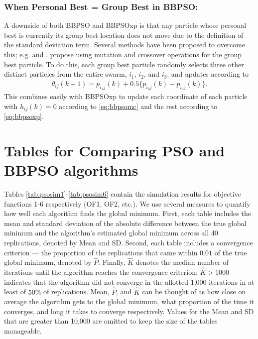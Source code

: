\documentclass[cmbright]{staauth}
\numberwithin{table}{section}
\begin{document}
\subsubsection{When Personal Best = Group Best in BBPSO:}
A downside of both BBPSO and BBPSOxp is that any particle whose personal best is currently its group best location does not move due to the definition of the standard deviation term. Several methods have been proposed to overcome this; e.g. \cite{hsieh2010modified} and \cite{zhang2011novel}. \cite{zhang2011novel} propose using mutation and crossover operations for the group best particle. To do this, each group best particle randomly selects three other distinct particles from the entire swarm, $i_1$, $i_2$, and $i_3$, and updates according to
\begin{align}\label{eq:bbpsomc}
\theta_{ij}(k+1) = p_{i_1j}(k) + 0.5\{p_{i_2j}(k) - p_{i_3j}(k)\}.
\end{align}
This combines easily with BBPSOxp to update each coordinate of each particle with $h_{ij}(k)=0$ according to \eqref{eq:bbpsomc} and the rest according to \eqref{eq:bbpsoxp}.

\section{Tables for Comparing PSO and BBPSO algorithms}\label{app:psotabs}

Tables \ref{tab:psosim1}-\ref{tab:psosim6} contain the simulation results for objective functions 1-6 respectively (OF1, OF2, etc.). We use several measures to quantify how well each algorithm finds the global minimum. First, each table includes the mean and standard deviation of the absolute difference between the true global minimum and the algorithm's estimated global minimum across all 40 replications, denoted by Mean and SD. Second, each table includes a convergence criterion --- the proportion of the replications that came within $0.01$ of the true global minimum, denoted by $\widehat{P}$. Finally, $\widehat{K}$ denotes the median number of iterations until the algorithm reaches the convergence criterion; $\widehat{K} > 1000$ indicates that the algorithm did not converge in the allotted 1,000 iterations in at least of $50\%$ of replications. Mean, $\widehat{P}$, and $\widehat{K}$ can be thought of as how close on average the algorithm gets to the global minimum, what proportion of the time it converges, and long it takes to converge respectively. Values for the Mean and SD that are greater than 10,000 are omitted to keep the size of the tables manageable.
\end{document}
